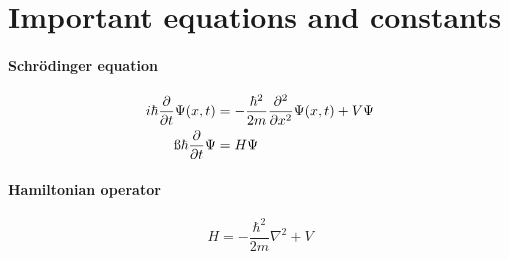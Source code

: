 \section*{Important equations and constants}\SectionRule
    \paragraph{Schrödinger equation}
    \begin{align*}
        i\hbar\dfrac{\partial}{\partial t}\Psi(x,t) &= -\frac{\hbar^2}{2m}\frac{\partial^2}{\partial x ^2}\Psi(x,t)+V\Psi \\
        \i\hbar\dfrac{\partial}{\partial t}\Psi &= H\Psi\\
    \end{align*}
    \paragraph{Hamiltonian operator}
    \[
        H = -\dfrac{\hbar^2}{2m}\nabla^2 +V
    \]
    